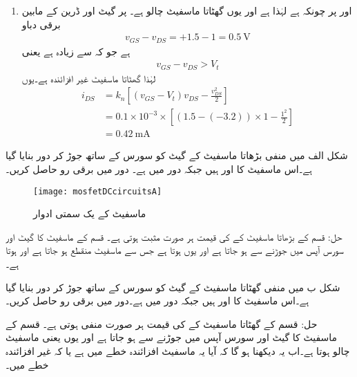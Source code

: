 \begin{enumerate}
\item
{} اور  	 پر چونکہ   ہے لہٰذا   ہے اور یوں گھٹاتا ماسفیٹ چالو ہے۔  پر گیٹ اور ڈرین کے مابین برقی دباو
\begin{align*}
v_{GS}-v_{DS}=+1.5-1=\SI{+0.5}{\volt}
\end{align*}
ہے جو کہ  سے زیادہ ہے یعنی
\begin{align*}
v_{GS}-v_{DS} > V_t
\end{align*}
لہٰذا گھٹاتا ماسفیٹ غیر افزائندہ ہے۔یوں
\begin{align*}
i_{DS}&=k_n \left[\left(v_{GS}-V_t \right )v_{DS}-\frac{v_{DS}^{2}}{2} \right ]\\
&=0.1 \times 10^{-3} \times \left[\left(1.5-(-3.2) \right ) \times  1 - \frac{1^2}{2} \right ]\\
&=\SI{0.42}{\milli \ampere}
\end{align*}

\end{enumerate}



شکل  الف میں منفی بڑھاتا ماسفیٹ کے گیٹ کو سورس کے ساتھ جوڑ کر دور بنایا گیا ہے۔اس ماسفیٹ کا    اور  ہیں جبکہ دور میں  ہے۔ دور میں برقی رو حاصل کریں۔
\begin{figure}
\centering
\texttt{[image: mosfetDCcircuitsA]}
\caption{ماسفیٹ کے یک سمتی ادوار}
\label{شکل_ماسفیٹ_کے_یک_سمتی_ادوار_الف}
\end{figure}
حل:  قسم کے بڑھاتا ماسفیٹ کے   کی قیمت ہر صورت مثبت ہوتی ہے۔  قسم کے ماسفیٹ کا گیٹ اور سورس آپس میں جوڑنے سے  ہو جاتا ہے اور یوں    ہوتا ہے جس سے ماسفیٹ منقطع ہو جاتا ہے اور    ہوتا ہے۔

شکل  ب میں منفی گھٹاتا ماسفیٹ کے گیٹ کو سورس کے ساتھ جوڑ کر دور بنایا گیا ہے۔اس ماسفیٹ کا  اور  ہیں  جبکہ دور میں   ہے۔دور میں برقی رو حاصل کریں۔

حل:  قسم کے گھٹاتا ماسفیٹ کے   کی قیمت ہر صورت منفی ہوتی ہے۔  قسم کے ماسفیٹ کا گیٹ اور سورس آپس میں جوڑنے سے    ہو جاتا ہے اور یوں   یعنی ماسفیٹ چالو ہوتا ہے۔اب یہ دیکھنا ہو گا کہ آیا یہ ماسفیٹ افزائندہ خطے میں ہے یا کہ غیر افزائندہ خطے میں۔

